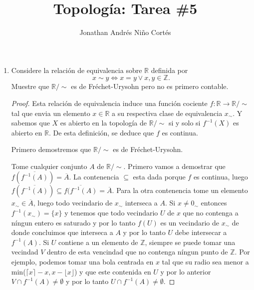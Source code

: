 \documentclass[letter,twoside,12pt]{article}
\title{Topología: Tarea \#5}
\author{Jonathan Andrés Niño Cortés}
\begin{document}
\maketitle
\begin{enumerate}
\item Considere la relación de equivalencia sobre $ \mathbb{R} $ definida por
\begin{equation}
x \sim y \Leftrightarrow x = y \vee x,y \in \mathbb{Z}. \nonumber
\end{equation}
Muestre que $ \mathbb{R}/\sim $ es de Fréchet-Urysohn pero no es primero contable.

\begin{proof}
Esta relación de equivalencia induce una función cociente $f: \mathbb{R} \to \mathbb{R}/\sim$ tal que envia un elemento $ x \in  \mathbb{R} $ a su respectiva clase de equivalencia $x_\sim$. Y sabemos que $X $ es abierto en la topología de $\mathbb{R}/\sim$ si y solo si $ f^{-1}(X) $ es abierto en $\mathbb{R}$. De esta definición, se deduce que $f$ es continua. 

Primero demostremos que $ \mathbb{R}/\sim $ es de Fréchet-Urysohn.

Tome cualquier conjunto $A$ de $ \mathbb{R}/\sim $.
Primero vamos a demostrar que $ f(\overline{f^{-1}(A)})=\overline{A} $. La contenencia $\subseteq$ esta dada porque $f$ es continua, luego $f(\overline{f^{-1}(A)}) \subseteq \overline{f(f^{-1}(A)}=\overline{A}$. Para la otra contenencia tome un elemento $x_\sim \in \overline{A}$, luego todo vecindario de $x_\sim$ interseca a $A$. Si $x \not = 0_\sim$ entonces $ f^{-1}(x_\sim)=\{x\} $ y tenemos que todo vecindario $U$ de $x$ que no contenga a níngun entero es saturado y por lo tanto $f(U)$ es un vecindario de $x_\sim$ de donde concluimos que interseca a $A$ y por lo tanto $U$ debe intersecar a $f^{-1}(A)$. Si $U$ contiene a un elemento de $\mathbb{Z}$, siempre se puede tomar una vecindad $V$ dentro de esta vencindad que no contenga níngun punto de $ \mathbb{Z} $. Por ejemplo, podemos tomar una bola centrada en $ x $ tal que su radio sea menor a min($ \lceil x \rceil -x, x-\lfloor x \rfloor$) y que este contenida en $U$ y por lo anterior $V \cap f^{-1}(A) \not = \emptyset$ y por lo tanto $U \cap f^{-1}(A) \not = \emptyset$.


\end{proof}
\end{enumerate}
\end{document}
